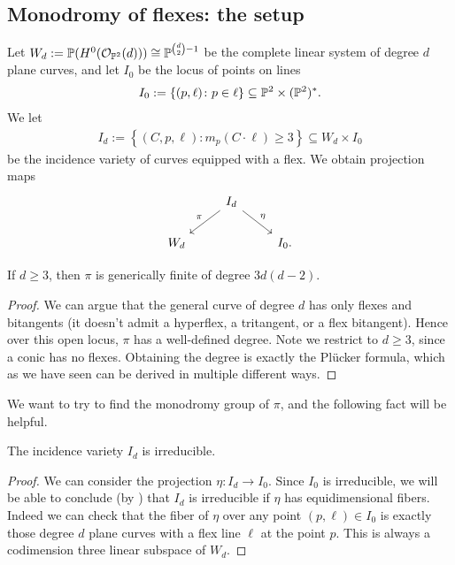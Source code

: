 \documentclass[11pt]{amsart}
\begin{document}
\subsection{Monodromy of flexes: the setup}

Let $W_d := \mathbb{P}(H^0(\O_{\P^2}(d))) \cong \P^{\binom{d}{2}-1}$ be the complete linear system of degree $d$ plane curves, and let $I_0$ be the locus of points on lines
\begin{align*}
    I_0 := \left\{ (p,\ell) \colon p\in \ell \right\} \subseteq \P^2 \times (\P^2)^\ast.
\end{align*}
We let
\begin{align*}
    I_d := \left\{ (C,p,\ell) : m_p(C\cdot \ell)\ge 3 \right\} \subseteq W_d \times I_0
\end{align*}
be the incidence variety of curves equipped with a flex. We obtain projection maps
\[ \begin{tikzcd}
     & I_d\ar[dl,"\pi" above left]\ar[dr,"\eta" above right] & \\
    W_d &  & I_0.
\end{tikzcd} \]
%
\begin{proposition} If $d \ge 3$, then $\pi$ is generically finite of degree $3d(d-2)$.
\end{proposition}
\begin{proof} We can argue that the general curve of degree $d$ has only flexes and bitangents (it doesn't admit a hyperflex, a tritangent, or a flex bitangent). Hence over this open locus, $\pi$ has a well-defined degree. Note we restrict to $d\ge 3$, since a conic has no flexes. Obtaining the degree is exactly the Pl\"{u}cker formula, which as we have seen can be derived in multiple different ways.
\end{proof}


We want to try to find the monodromy group of $\pi$, and the following fact will be helpful.

\begin{proposition}\label{prop:Id-irred-flexes}
The incidence variety $I_d$ is irreducible.
\end{proposition}
\begin{proof} We can consider the projection $\eta \colon I_d \to I_0$. Since $I_0$ is irreducible, we will be able to conclude (by ) that $I_d$ is irreducible if $\eta$ has equidimensional fibers. Indeed we can check that the fiber of $\eta$ over any point $(p,\ell) \in I_0$ is exactly those degree $d$ plane curves with a flex line $\ell$ at the point $p$. This is always a codimension three linear subspace of $W_d$.
\end{proof}
\end{document}
